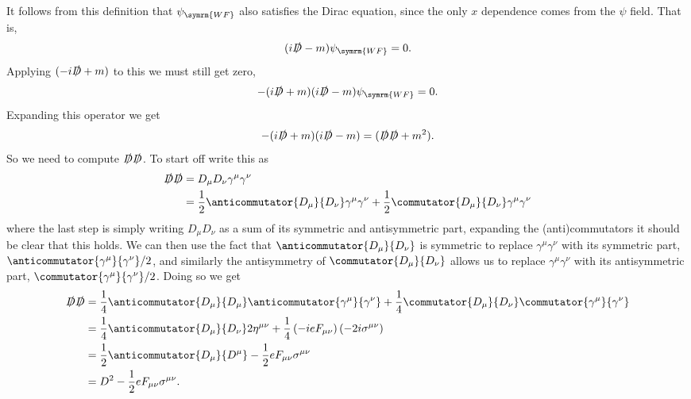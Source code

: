 \documentclass[fleqn]{NotesClass}
\newcommand{\covariantDerivative}{D}
\newcommand{\minkowskiMetric}{\eta}
\begin{document}
    It follows from this definition that \(\psi_{\symrm{WF}}\) also satisfies the Dirac equation, since the only \(x\) dependence comes from the \(\psi\) field.
    That is,
    \begin{equation}
        (i\slashed{\covariantDerivative} - m)\psi_{\symrm{WF}} = 0.
    \end{equation}
    Applying \((-i\slashed{\covariantDerivative} + m)\) to this we must still get zero,
    \begin{equation}
        -(i\slashed{\covariantDerivative} + m)(i\slashed{\covariantDerivative} - m)\psi_{\symrm{WF}} = 0.
    \end{equation}
    Expanding this operator we get
    \begin{equation}
        -(i\slashed{\covariantDerivative} + m)(i\slashed{\covariantDerivative} - m) = (\slashed{\covariantDerivative}\slashed{\covariantDerivative} + m^2).
    \end{equation}
    So we need to compute \(\slashed{\covariantDerivative}\slashed{\covariantDerivative}\).
    To start off write this as
    \begin{align}
        \slashed{\covariantDerivative}\slashed{\covariantDerivative} &= \covariantDerivative_\mu \covariantDerivative_\nu \gamma^\mu \gamma^\nu\\
        &= \frac{1}{2}\anticommutator{\covariantDerivative_\mu}{\covariantDerivative_\nu}\gamma^\mu \gamma^\nu + \frac{1}{2}\commutator{\covariantDerivative_\mu}{\covariantDerivative_\nu}\gamma^\mu \gamma^\nu
    \end{align}
    where the last step is simply writing \(\covariantDerivative_\mu \covariantDerivative_\nu\) as a sum of its symmetric and antisymmetric part, expanding the (anti)commutators it should be clear that this holds.
    We can then use the fact that \(\anticommutator{\covariantDerivative_\mu}{\covariantDerivative_\nu}\) is symmetric to replace \(\gamma^\mu\gamma^\nu\) with its symmetric part, \(\anticommutator{\gamma^\mu}{\gamma^\nu}/2\), and similarly the antisymmetry of \(\commutator{\covariantDerivative_\mu}{\covariantDerivative_\nu}\) allows us to replace \(\gamma^\mu\gamma^\nu\) with its antisymmetric part, \(\commutator{\gamma^\mu}{\gamma^\nu}/2\).
    Doing so we get
    \begin{align}
        \slashed{\covariantDerivative}\slashed{\covariantDerivative} &= \frac{1}{4}\anticommutator{\covariantDerivative_\mu}{\covariantDerivative_\mu} \anticommutator{\gamma^\mu}{\gamma^\nu} + \frac{1}{4}\commutator{\covariantDerivative_\mu}{\covariantDerivative_\nu} \commutator{\gamma^\mu}{\gamma^\nu}\\
        &= \frac{1}{4}\anticommutator{\covariantDerivative_\mu}{\covariantDerivative_\nu} 2\minkowskiMetric^{\mu\nu} + \frac{1}{4}\left( -ieF_{\mu\nu} \right) ( -2i\sigma^{\mu\nu} )\\
        &= \frac{1}{2} \anticommutator{\covariantDerivative_\mu}{\covariantDerivative^\mu} - \frac{1}{2}eF_{\mu\nu} \sigma^{\mu\nu}\\
        &= \covariantDerivative^2 - \frac{1}{2}eF_{\mu\nu} \sigma^{\mu\nu}.
    \end{align}
\end{document}
